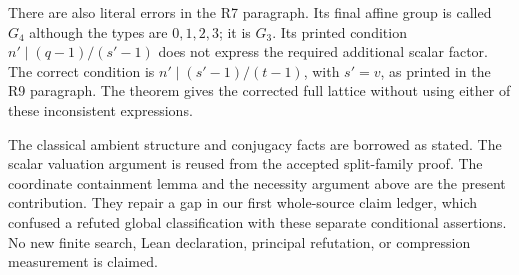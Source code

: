 \documentclass[11pt,a4paper]{article}
\begin{document}
There are also literal errors in the R7 paragraph. Its final affine
group is called $G_4$ although the types are $0,1,2,3$; it is $G_3$.
Its printed condition $n'\mid(q-1)/(s'-1)$ does not express the
required additional scalar factor. The correct condition is
$n'\mid(s'-1)/(t-1)$, with $s'=v$, as printed in the R9 paragraph.
The theorem gives the corrected full lattice without using either
of these inconsistent expressions.

The classical ambient structure and conjugacy facts are borrowed as
stated. The scalar valuation argument is reused from the accepted
split-family proof. The coordinate containment lemma and the necessity
argument above are the present contribution. They repair a gap in our
first whole-source claim ledger, which confused a refuted global
classification with these separate conditional assertions. No new
finite search, Lean declaration, principal refutation, or compression
measurement is claimed.
\end{document}
